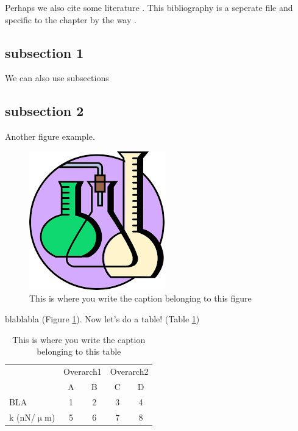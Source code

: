 \begin{refsection}
Perhaps we also cite some literature \cite{Marion1995}. This bibliography is a seperate file and specific to the chapter by the way  \cite{Marion1995, rezakhaniha2012}.

\subsection{subsection 1}
We can also use subsections 


\subsection{subsection 2}
Another figure example.

\begin{figure}
\begin{center}
\includegraphics[width=0.7\columnwidth]{./C3_Topic2/figure_2/fig2.png}
\caption{\label{fig:LABELFORFIG3_2} This is where you write the caption belonging to this figure}
\end{center}
\end{figure}


blablabla (Figure \ref{fig:LABELFORFIG3_2}). Now let's do a table! (Table \ref{tab:LABELFORTBL3_1})

\begin{table}[H]
\centering
\begin{tabular}{l c c | c c}
 	& 	\multicolumn{2}{c}{Overarch1}   		& \multicolumn{2}{c}{Overarch2} \\
 	& A & B 	& C & D \\
\cline{2-5}
BLA & 1 & 2 & 3 & 4 \\
k (nN/$\upmu$m) & 5 & 6 & 7 & 8 \\
\cline{2-5}
\end{tabular}

\caption{\label{tab:LABELFORTBL3_1}This is where you write the caption belonging to this table}
\end{table}

\newpage
\printbibliography[title={Bibliography}]
\end{refsection}

